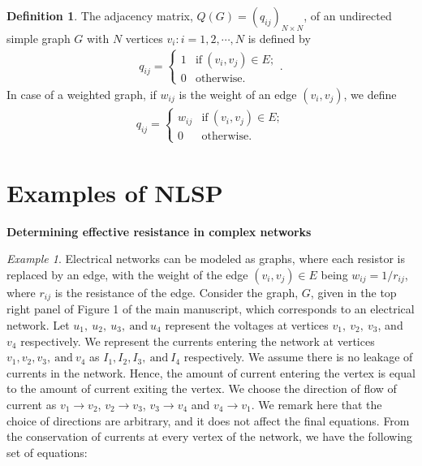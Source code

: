\documentclass[%
 reprint,
 superscriptaddress,
 amsmath,amssymb,
 aps,
 pra,
floatfix,
nofootinbib,
]{revtex4-2}
\theoremstyle{definition}
\newtheorem{definition}{Definition}[section]
\theoremstyle{remark}
\newtheorem{example}{Example}
\newcommand{\appsubsection}[1]{%
  \refstepcounter{subsection}%
  \bigskip
  \noindent\textbf{\thesubsection\quad #1}\par
  \smallskip
}
\begin{document}
\begin{appendix}
\begin{definition} \label{def:adjmat}
The adjacency matrix, $Q(G) = (q_{ij})_{N \times N}$, of an undirected simple graph $G$ with $N$ vertices $v_i: i = 1, 2, \cdots, N$ is defined by 
\begin{eqnarray}
q_{ij} = 
\begin{cases}
1 & \text{if}~ (v_i, v_j)\in E; \\
0 & \text{otherwise}.
\end{cases}. 
\end{eqnarray}
In case of a weighted graph, if $w_{ij}$ is the weight of an edge $(v_i, v_j)$, we define
\begin{eqnarray}
q_{ij} = 
\begin{cases}
w_{ij} & \text{if}~ (v_i, v_j) \in E; \\
0 & \text{otherwise}.
\end{cases}
\end{eqnarray}
\end{definition} 

\section{Examples of NLSP} \label{sm:nlspexample}

\appsubsection{Determining effective resistance in complex networks} 

\begin{example} \label{ex1}
Electrical networks can be modeled as graphs, where each resistor is replaced by an edge, with the weight of the edge $(v_i, v_j) \in E$ being $w_{ij} = 1/r_{ij}$, where $r_{ij}$ is the resistance of the edge. Consider the graph, $G$, given in the top right panel of Figure 1 of the main manuscript, which corresponds to an electrical network. Let $u_1,\ u_2,\ u_3, \  \text{and} \ u_4$ represent the voltages at vertices $v_1,\ v_2,\ v_3$, and $v_4$ respectively. We represent the currents entering the network at vertices $ v_1, v_2, v_3, \  \text{and} \ v_4 $ as $I_1, I_2, I_3, \  \text{and} \ I_4$ respectively. We assume there is no leakage of currents in the network. Hence, the amount of current entering the vertex is equal to the amount of current exiting the vertex. We choose the direction of flow of current as $v_1 \to v_2$, $v_2 \to v_3$, $v_3 \to v_4$ and $v_4 \to v_1$. We remark here that the choice of directions are arbitrary, and it does not affect the final equations. From the conservation of currents at every vertex of the network, we have the following set of equations: 


\end{example}
\end{appendix}
\end{document}
